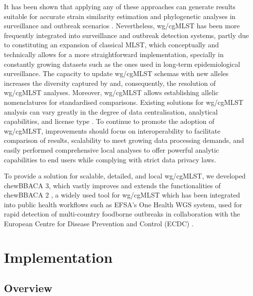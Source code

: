 It has been shown that applying any of these approaches can generate results suitable for accurate strain similarity estimation and phylogenetic analyses in surveillance and outbreak scenarios \citep{uelze_typing_2020, bush_genomic_2020, valiente-mullor_one_2021, ndiaye_when_2024, belbasi_minimizer_2022, king_comparison_2024}. Nevertheless, wg/cgMLST has been more frequently integrated into surveillance and outbreak detection systems, partly due to constituting an expansion of classical MLST, which conceptually and technically allows for a more straightforward implementation, specially in constantly growing datasets such as the ones used in long-term epidemiological surveillance. The capacity to update wg/cgMLST schemas with new alleles increases the diversity captured by and, consequently, the resolution of wg/cgMLST analyses. Moreover, wg/cgMLST allows establishing allelic nomenclatures for standardised comparisons. Existing solutions for wg/cgMLST analysis can vary greatly in the degree of data centralisation, analytical capabilities, and license type \citep{jolley_bigsdb_2010, zhou_enterobase_2020, mamede_chewie_2021}. To continue to promote the adoption of wg/cgMLST, improvements should focus on interoperability to facilitate comparison of results, scalability to meet growing data processing demands, and easily performed comprehensive local analyses to offer powerful analytic capabilities to end users while complying with strict data privacy laws.

To provide a solution for scalable, detailed, and local wg/cgMLST, we developed chewBBACA 3, which vastly improves and extends the functionalities of chewBBACA 2 \citep{mamede_chewie_2021, silva_chewbbaca_2018}, a widely used tool for wg/cgMLST which has been integrated into public health workflows such as EFSA's One Health WGS system, used for rapid detection of multi-country foodborne outbreaks in collaboration with the European Centre for Disease Prevention and Control (ECDC) \citep{authority_efsa_guidelines_2022}.

\section{Implementation} \label{sec:implementation}

\subsection{Overview} \label{ssec:overview}


